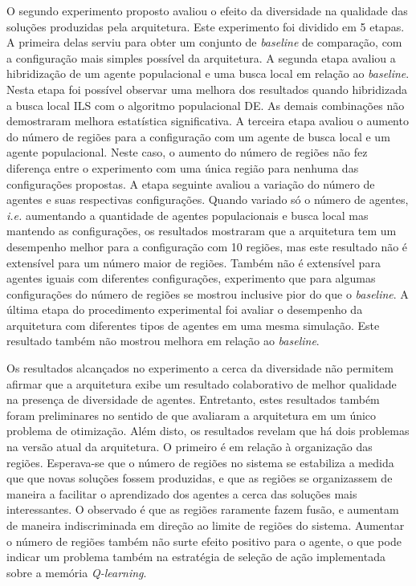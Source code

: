 O segundo experimento proposto avaliou o efeito da diversidade na qualidade das soluções produzidas pela arquitetura. Este experimento foi dividido em 5 etapas. A primeira delas serviu para obter um conjunto de \textit{baseline} de comparação, com a configuração mais simples possível da arquitetura. A segunda etapa avaliou a hibridização de um agente populacional e uma busca local em relação ao \textit{baseline}. Nesta etapa foi possível observar uma melhora dos resultados quando hibridizada a busca local ILS com o algoritmo populacional DE. As demais combinações não demostraram melhora estatística significativa. A terceira etapa avaliou o aumento do número de regiões para a configuração com um agente de busca local e um agente populacional. Neste caso, o aumento do número de regiões não fez diferença entre o experimento com uma única região para nenhuma das configurações propostas. A etapa seguinte avaliou a variação do número de agentes e suas respectivas configurações. Quando variado só o número de agentes, \textit{i.e.} aumentando a quantidade de agentes populacionais e busca local mas mantendo as configurações, os resultados mostraram que a arquitetura tem um desempenho melhor para a configuração com 10 regiões, mas este resultado não é extensível para um número maior de regiões. Também não é extensível para agentes iguais com diferentes configurações, experimento que para algumas configurações do número de regiões se mostrou inclusive pior do que o \textit{baseline}. A última etapa do procedimento experimental foi avaliar o desempenho da arquitetura com diferentes tipos de agentes em uma mesma simulação. Este resultado também não mostrou melhora em relação ao \textit{baseline}.

Os resultados alcançados no experimento a cerca da diversidade não permitem afirmar que a arquitetura exibe um resultado colaborativo de melhor qualidade na presença de diversidade de agentes. Entretanto, estes resultados também foram preliminares no sentido de que avaliaram a arquitetura em um único problema de otimização. Além disto, os resultados revelam que há dois problemas na versão atual da arquitetura. O primeiro é em relação à organização das regiões. Esperava-se que o número de regiões no sistema se estabiliza a medida que que novas soluções fossem produzidas, e que as regiões se organizassem de maneira a facilitar o aprendizado dos agentes a cerca das soluções mais interessantes. O observado é que as regiões raramente fazem fusão, e aumentam de maneira indiscriminada em direção ao limite de regiões do sistema. Aumentar o número de regiões também não surte efeito positivo para o agente, o que pode indicar um problema também na estratégia de seleção de ação implementada sobre a memória \textit{Q-learning}. 

